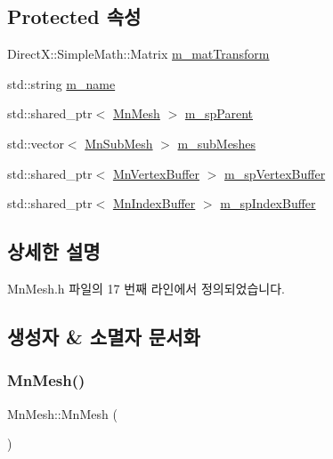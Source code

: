 \subsection*{Protected 속성}
\begin{DoxyCompactItemize}
\item 
Direct\+X\+::\+Simple\+Math\+::\+Matrix \hyperlink{class_m_n_l_1_1_mn_mesh_a3617de4ff06fb44e929375c976749e39}{m\+\_\+mat\+Transform}
\item 
std\+::string \hyperlink{class_m_n_l_1_1_mn_mesh_a571897045eb370a1f780cf13e9c34113}{m\+\_\+name}
\item 
std\+::shared\+\_\+ptr$<$ \hyperlink{class_m_n_l_1_1_mn_mesh}{Mn\+Mesh} $>$ \hyperlink{class_m_n_l_1_1_mn_mesh_a5fcd00e08db33a48849fb837a4ac971f}{m\+\_\+sp\+Parent}
\item 
std\+::vector$<$ \hyperlink{struct_m_n_l_1_1_mn_sub_mesh}{Mn\+Sub\+Mesh} $>$ \hyperlink{class_m_n_l_1_1_mn_mesh_a1319f6800c28153c09fba2eb1843a41d}{m\+\_\+sub\+Meshes}
\item 
std\+::shared\+\_\+ptr$<$ \hyperlink{class_m_n_l_1_1_mn_vertex_buffer}{Mn\+Vertex\+Buffer} $>$ \hyperlink{class_m_n_l_1_1_mn_mesh_aff6e55968332581a0848069303689fa4}{m\+\_\+sp\+Vertex\+Buffer}
\item 
std\+::shared\+\_\+ptr$<$ \hyperlink{class_m_n_l_1_1_mn_index_buffer}{Mn\+Index\+Buffer} $>$ \hyperlink{class_m_n_l_1_1_mn_mesh_a03f3e7ccea4728ab9f6846eca2794dd8}{m\+\_\+sp\+Index\+Buffer}
\end{DoxyCompactItemize}


\subsection{상세한 설명}


Mn\+Mesh.\+h 파일의 17 번째 라인에서 정의되었습니다.



\subsection{생성자 \& 소멸자 문서화}
\mbox{\label{class_m_n_l_1_1_mn_mesh_a5a2ad03a6baa88d7563df3cc17e36b12}} 
\subsubsection{\texorpdfstring{Mn\+Mesh()}{MnMesh()}}
{\footnotesize\ttfamily Mn\+Mesh\+::\+Mn\+Mesh (\begin{DoxyParamCaption}{ }\end{DoxyParamCaption})}



